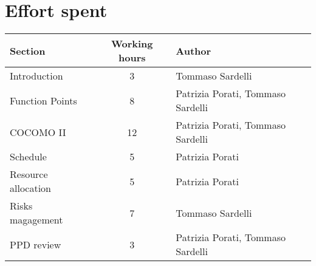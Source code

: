 \clearpage
\section{Effort spent}

\begin{center}
	\begin{tabular}{ l c l } 
		\hline
		\textbf{Section} 	& \textbf{Working hours} 	& \textbf{Author} \\ 
		\hline
		Introduction 	& 3 	& Tommaso Sardelli	\\
		Function Points	 	& 8 	& Patrizia Porati, Tommaso Sardelli	\\
		COCOMO II 	& 12 	& Patrizia Porati, Tommaso Sardelli \\ 
		Schedule 	& 5 	& Patrizia Porati	\\
		Resource allocation 	& 5 	& Patrizia Porati \\
		Risks magagement 	& 7 	& Tommaso Sardelli \\
		PPD review 	& 3 	& Patrizia Porati, Tommaso Sardelli \\
		\hline
	\end{tabular}
	\vspace{0.4cm}
\end{center}
